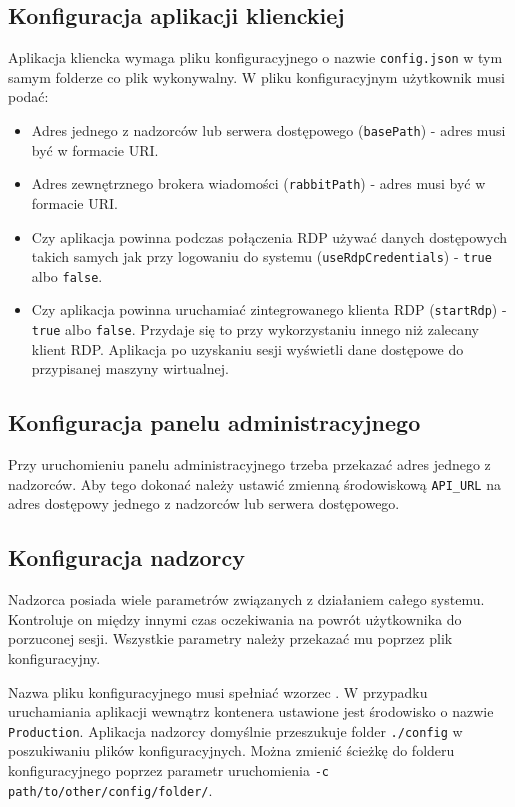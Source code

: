 \documentclass[../opis-rozwiazania.tex]{subfiles}
\begin{document}
\subsection{Konfiguracja aplikacji klienckiej}
Aplikacja kliencka wymaga pliku konfiguracyjnego o nazwie \texttt{config.json} w tym samym folderze co plik wykonywalny.
W pliku konfiguracyjnym użytkownik musi podać:
\begin{itemize}
  \item Adres jednego z nadzorców lub serwera dostępowego (\texttt{basePath}) - adres musi być w formacie URI.
  \item Adres zewnętrznego brokera wiadomości (\texttt{rabbitPath}) - adres musi być w formacie URI.
  \item Czy aplikacja powinna podczas połączenia RDP używać danych dostępowych takich samych jak przy logowaniu do systemu (\texttt{useRdpCredentials}) - \texttt{true} albo \texttt{false}.
  \item Czy aplikacja powinna uruchamiać zintegrowanego klienta RDP (\texttt{startRdp}) - \texttt{true} albo \texttt{false}. Przydaje się to przy wykorzystaniu innego niż zalecany klient RDP. Aplikacja po uzyskaniu sesji wyświetli dane dostępowe do przypisanej maszyny wirtualnej.
\end{itemize}

\subsection{Konfiguracja panelu administracyjnego}
\label{system_startup.admin_panel_conf}
Przy uruchomieniu panelu administracyjnego trzeba przekazać adres jednego z nadzorców.
Aby tego dokonać należy ustawić zmienną środowiskową \texttt{API\_URL} na adres dostępowy jednego z nadzorców lub serwera dostępowego.

\subsection{Konfiguracja nadzorcy}
\label{system_startup.overseer_conf}
Nadzorca posiada wiele parametrów związanych z działaniem całego systemu.
Kontroluje on między innymi czas oczekiwania na powrót użytkownika do porzuconej sesji.
Wszystkie parametry należy przekazać mu poprzez plik konfiguracyjny.

Nazwa pliku konfiguracyjnego musi spełniać wzorzec \texttt{}.
W przypadku uruchamiania aplikacji wewnątrz kontenera ustawione jest środowisko o nazwie \texttt{Production}.
Aplikacja nadzorcy domyślnie przeszukuje folder \texttt{./config} w poszukiwaniu plików konfiguracyjnych.
Można zmienić ścieżkę do folderu konfiguracyjnego poprzez parametr uruchomienia \texttt{-c path/to/other/config/folder/}.
\end{document}
